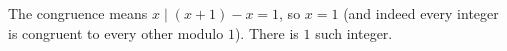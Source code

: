 The congruence means $x\mid(x+1)-x=1$, so $x=1$ (and indeed every integer is congruent to every other modulo $1$). There is $\boxed{1}$ such integer.
